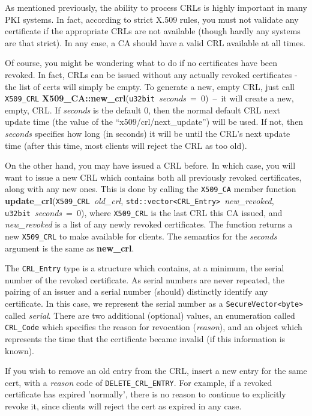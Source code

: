 \documentclass{article}
\newcommand{\function}[1]{\textbf{#1}}
\newcommand{\type}[1]{\texttt{#1}}
\renewcommand{\arg}[1]{\textsl{#1}}
\begin{document}
As mentioned previously, the ability to process CRLs is highly important in
many PKI systems. In fact, according to strict X.509 rules, you must not
validate any certificate if the appropriate CRLs are not available (though
hardly any systems are that strict). In any case, a CA should have a valid CRL
available at all times.

Of course, you might be wondering what to do if no certificates have been
revoked. In fact, CRLs can be issued without any actually revoked certificates
- the list of certs will simply be empty. To generate a new, empty CRL, just
call \type{X509\_CRL}
\function{X509\_CA::new\_crl}(\type{u32bit}~\arg{seconds}~=~0)~--~it will
create a new, empty, CRL. If \arg{seconds} is the default 0, then the normal
default CRL next update time (the value of the ``x509/crl/next\_update'') will
be used. If not, then \arg{seconds} specifies how long (in seconds) it will be
until the CRL's next update time (after this time, most clients will reject the
CRL as too old).

On the other hand, you may have issued a CRL before. In which case, you will
want to issue a new CRL which contains both all previously revoked
certificates, along with any new ones. This is done by calling the
\type{X509\_CA} member function
\function{update\_crl}(\type{X509\_CRL}~\arg{old\_crl},
\type{std::vector<CRL\_Entry>}~\arg{new\_revoked},
\type{u32bit}~\arg{seconds}~=~0), where \type{X509\_CRL} is the last CRL this
CA issued, and \arg{new\_revoked} is a list of any newly revoked certificates.
The function returns a new \type{X509\_CRL} to make available for clients. The
semantics for the \arg{seconds} argument is the same as \function{new\_crl}.

The \type{CRL\_Entry} type is a structure which contains, at a minimum, the
serial number of the revoked certificate. As serial numbers are never repeated,
the pairing of an issuer and a serial number (should) distinctly identify any
certificate. In this case, we represent the serial number as a
\type{SecureVector<byte>} called \arg{serial}. There are two additional
(optional) values, an enumeration called \type{CRL\_Code} which specifies the
reason for revocation (\arg{reason}), and an object which represents the time
that the certificate became invalid (if this information is known).

If you wish to remove an old entry from the CRL, insert a new entry for the
same cert, with a \arg{reason} code of \type{DELETE\_CRL\_ENTRY}. For example,
if a revoked certificate has expired 'normally', there is no reason to continue
to explicitly revoke it, since clients will reject the cert as expired in any
case.
\end{document}
